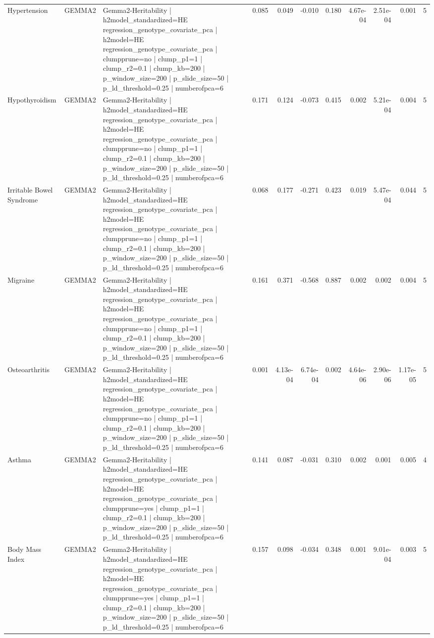\begin{landscape}
\begin{longtable}{p{2.4cm}p{1.8cm}p{6.0cm}rrrrrrrr}
Hypertension & GEMMA2 & Gemma2-Heritability | h2model\_standardized=HE regression\_genotype\_covariate\_pca | h2model=HE regression\_genotype\_covariate\_pca | clumpprune=no | clump\_p1=1 | clump\_r2=0.1 | clump\_kb=200 | p\_window\_size=200 | p\_slide\_size=50 | p\_ld\_threshold=0.25 | numberofpca=6 & 0.085 & 0.049 & -0.010 & 0.180 & 4.67e-04 & 2.51e-04 & 0.001 & 5 \\
Hypothyroidism & GEMMA2 & Gemma2-Heritability | h2model\_standardized=HE regression\_genotype\_covariate\_pca | h2model=HE regression\_genotype\_covariate\_pca | clumpprune=no | clump\_p1=1 | clump\_r2=0.1 | clump\_kb=200 | p\_window\_size=200 | p\_slide\_size=50 | p\_ld\_threshold=0.25 | numberofpca=6 & 0.171 & 0.124 & -0.073 & 0.415 & 0.002 & 5.21e-04 & 0.004 & 5 \\
Irritable Bowel Syndrome & GEMMA2 & Gemma2-Heritability | h2model\_standardized=HE regression\_genotype\_covariate\_pca | h2model=HE regression\_genotype\_covariate\_pca | clumpprune=no | clump\_p1=1 | clump\_r2=0.1 | clump\_kb=200 | p\_window\_size=200 | p\_slide\_size=50 | p\_ld\_threshold=0.25 | numberofpca=6 & 0.068 & 0.177 & -0.271 & 0.423 & 0.019 & 5.47e-04 & 0.044 & 5 \\
Migraine & GEMMA2 & Gemma2-Heritability | h2model\_standardized=HE regression\_genotype\_covariate\_pca | h2model=HE regression\_genotype\_covariate\_pca | clumpprune=no | clump\_p1=1 | clump\_r2=0.1 | clump\_kb=200 | p\_window\_size=200 | p\_slide\_size=50 | p\_ld\_threshold=0.25 | numberofpca=6 & 0.161 & 0.371 & -0.568 & 0.887 & 0.002 & 0.002 & 0.004 & 5 \\
Osteoarthritis & GEMMA2 & Gemma2-Heritability | h2model\_standardized=HE regression\_genotype\_covariate\_pca | h2model=HE regression\_genotype\_covariate\_pca | clumpprune=no | clump\_p1=1 | clump\_r2=0.1 | clump\_kb=200 | p\_window\_size=200 | p\_slide\_size=50 | p\_ld\_threshold=0.25 | numberofpca=6 & 0.001 & 4.13e-04 & 6.74e-04 & 0.002 & 4.64e-06 & 2.90e-06 & 1.17e-05 & 5 \\
Asthma & GEMMA2 & Gemma2-Heritability | h2model\_standardized=HE regression\_genotype\_covariate\_pca | h2model=HE regression\_genotype\_covariate\_pca | clumpprune=yes | clump\_p1=1 | clump\_r2=0.1 | clump\_kb=200 | p\_window\_size=200 | p\_slide\_size=50 | p\_ld\_threshold=0.25 | numberofpca=6 & 0.141 & 0.087 & -0.031 & 0.310 & 0.002 & 0.001 & 0.005 & 4 \\
Body Mass Index & GEMMA2 & Gemma2-Heritability | h2model\_standardized=HE regression\_genotype\_covariate\_pca | h2model=HE regression\_genotype\_covariate\_pca | clumpprune=yes | clump\_p1=1 | clump\_r2=0.1 | clump\_kb=200 | p\_window\_size=200 | p\_slide\_size=50 | p\_ld\_threshold=0.25 | numberofpca=6 & 0.157 & 0.098 & -0.034 & 0.348 & 0.001 & 9.01e-04 & 0.003 & 5 \\

\end{longtable}
\end{landscape}
